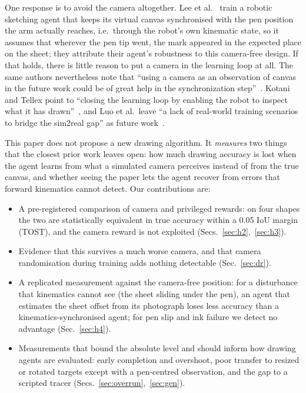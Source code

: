\documentclass[conference]{IEEEtran}
\begin{document}
One response is to avoid the camera altogether. Lee et al.~\cite{D01} train a robotic
sketching agent that keeps its virtual canvas synchronised with the pen position the arm
actually reaches, i.e.\ through the robot's own kinematic state, so it assumes that
wherever the pen tip went, the mark appeared in the expected place on the sheet; they
attribute their agent's robustness to this camera-free design. %
If that holds, there is little reason to put a camera in the learning loop at
all. The same authors nevertheless note that ``using a camera as an observation of canvas
in the future work could be of great help in the synchronization step''~\cite{D01}.
Kotani and Tellex point to ``closing the learning loop by enabling the robot to inspect
what it has drawn''~\cite{D03}, and Luo et al.\ leave ``a lack of real-world training
scenarios to bridge the sim2real gap'' as future work~\cite{D09}.

This paper does not propose a new drawing algorithm. It \emph{measures} two things that
the closest prior work leaves open: how much drawing accuracy is lost when the agent
learns from what a simulated camera perceives instead of from the true canvas, and
whether seeing the paper lets the agent recover from errors that forward kinematics
cannot detect. Our contributions are:
\begin{itemize}
\item A pre-registered comparison of camera and privileged rewards: on four shapes the
  two are statistically equivalent in true accuracy within a 0.05 IoU margin (TOST), %
  and the camera reward is not exploited (Secs.~\ref{sec:h2},~\ref{sec:h3}).
\item Evidence that this survives a much worse camera, and that camera randomisation
  during training adds nothing detectable (Sec.~\ref{sec:dr}).
\item A replicated measurement against the camera-free position: for a disturbance that
  kinematics cannot see (the sheet sliding under the pen), an agent that estimates the
  sheet offset from its photograph loses less accuracy than a kinematics-synchronised
  agent; for pen slip and ink failure we detect no advantage (Sec.~\ref{sec:h4}).
\item Measurements that bound the absolute level and should inform how drawing agents are
  evaluated: early completion and overshoot, poor transfer to resized or rotated targets
  except with a pen-centred observation, and the gap to a scripted tracer
  (Secs.~\ref{sec:overrun},~\ref{sec:gen}).
\end{itemize}
\end{document}
